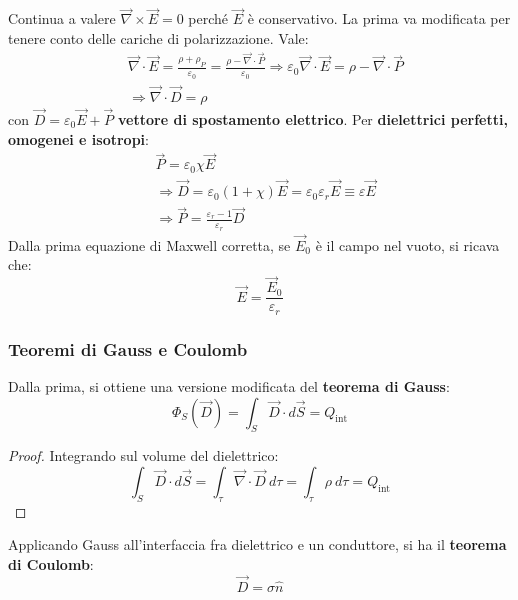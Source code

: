 \documentclass[10pt, a4paper]{scrartcl}
\numberwithin{equation}{subsection}
\theoremstyle{style1}
\newenvironment{boxenv}[1][]{
    \begin{eqbox}[#1]
    }{
   \end{eqbox}
}
\begin{document}
Continua a valere $\vec{\nabla }\times \vec{E}=0$ perch\'e $\vec{E}$ \`e conservativo. La prima va modificata per tenere conto delle cariche di polarizzazione. Vale:
\begin{equation}
	\begin{split}
		&\vec{\nabla }\cdot \vec{E} = \frac{\rho  + \rho _P}{\varepsilon _0} = \frac{\rho  - \vec{\nabla }\cdot \vec{P}}{\varepsilon _0} \Rightarrow  \varepsilon _0 \vec{\nabla }\cdot \vec{E} = \rho  - \vec{\nabla }\cdot \vec{P}\\
		&\Rightarrow \vec{\nabla }\cdot \vec{D}= \rho 
	\end{split}
\end{equation}
con $\vec{D} = \varepsilon _0 \vec{E}+\vec{P}$ \textbf{vettore di spostamento elettrico}. Per \textbf{dielettrici perfetti, omogenei e isotropi}:
\begin{equation}
	\begin{split}
		&\vec{P} = \varepsilon _0 \chi \vec{E} \\
		&\Rightarrow  \vec{D} = \varepsilon _0 (1+\chi )\vec{E} = \varepsilon _0 \varepsilon _r \vec{E}\equiv \varepsilon \vec{E}\\
		&\Rightarrow \vec{ P} = \frac{\varepsilon _r -1}{\varepsilon _r}\vec{D}
	\end{split}
\end{equation}
Dalla prima equazione di Maxwell corretta, se $\vec{E}_0$ \`e il campo nel vuoto, si ricava che:
\begin{equation}
	\vec{E} = \frac{\vec{E}_0}{\varepsilon _r}
\end{equation}
\subsubsection{Teoremi di Gauss e Coulomb}

Dalla prima, si ottiene una versione modificata del \textbf{teorema di Gauss}:
\begin{equation}
	\Phi_S (\vec{D}) = \int_{S} \vec{D}\cdot d\vec{S} = Q_\text{int}
\end{equation}
\begin{boxenv}[]
\begin{proof}
Integrando sul volume del dielettrico:
\begin{equation}
	\int_{S} \vec{D} \cdot d\vec{S}=\int_{\tau } \vec{\nabla }\cdot \vec{D} \ d\tau = \int_{\tau } \rho \ d\tau  = Q_\text{int}
\end{equation}
\end{proof}
\end{boxenv}
\noindent Applicando Gauss all'interfaccia fra dielettrico e un conduttore, si ha il \textbf{teorema di Coulomb}:
\begin{equation}
\vec{D} = \sigma \hat{n}
\end{equation}
\end{document}
